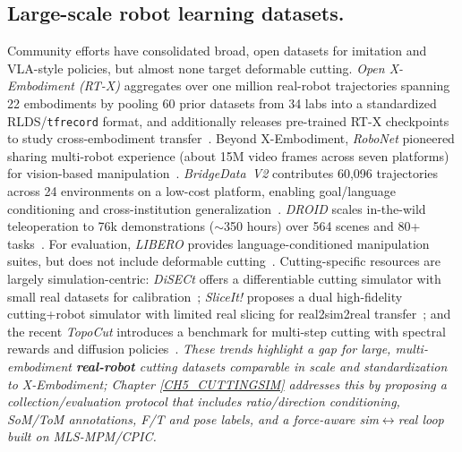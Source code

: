 \subsection{Large-scale robot learning datasets.}
    Community efforts have consolidated broad, open datasets for imitation and VLA-style policies, but almost none target deformable cutting. \emph{Open X-Embodiment (RT-X)} aggregates over one million real-robot trajectories spanning 22 embodiments by pooling 60 prior datasets from 34 labs into a standardized RLDS/\texttt{tfrecord} format, and additionally releases pre-trained RT-X checkpoints to study cross-embodiment transfer~\citep{o2024open}. Beyond X-Embodiment, \emph{RoboNet} pioneered sharing multi-robot experience (about 15M video frames across seven platforms) for vision-based manipulation~\citep{robonet2019}. \emph{BridgeData~V2} contributes 60{,}096 trajectories across 24 environments on a low-cost platform, enabling goal/language conditioning and cross-institution generalization~\citep{bridgedata2023}. \emph{DROID} scales in-the-wild teleoperation to 76k demonstrations ($\sim$350 hours) over 564 scenes and 80+ tasks~\citep{khazatsky2025droidlargescaleinthewildrobot}. For evaluation, \emph{LIBERO} provides language-conditioned manipulation suites, but does not include deformable cutting~\citep{libero2023}. Cutting-specific resources are largely simulation-centric: \emph{DiSECt} offers a differentiable cutting simulator with small real datasets for calibration~\citep{disect2022}; \emph{SliceIt!} proposes a dual high-fidelity cutting+robot simulator with limited real slicing for real2sim2real transfer~\citep{sliceit2024}; and the recent \emph{TopoCut} introduces a benchmark for multi-step cutting with spectral rewards and diffusion policies~\citep{topocut2025}. \emph{These trends highlight a gap for large, multi-embodiment \textbf{real-robot} cutting datasets comparable in scale and standardization to X-Embodiment; Chapter \ref{CH5_CUTTINGSIM} addresses this by proposing a collection/evaluation protocol that includes ratio/direction conditioning, SoM/ToM annotations, F/T and pose labels, and a force-aware sim$\leftrightarrow$real loop built on MLS-MPM/CPIC.}
    